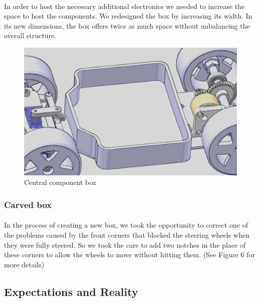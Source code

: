 \paragraph{}
In order to host the necessary additional electronics we needed to increase the
space to host the components. We redesigned the box by increasing its width.
In its new dimensions, the box offers twice as much space without unbalancing
the overall structure.

\begin{figure}[!ht]
    \begin{center}
        \includegraphics[scale=0.45]{Images/kart_central_box.png}
    \end{center}
    \caption{Central component box}
    \label{fig:raspi_config}
\end{figure}

\subsubsection{Carved box}
\paragraph{}

In the process of creating a new box, we took the opportunity to correct one
of the problems caused by the front corners that blocked the steering wheels
when they were fully steered. So we took the care to add two notches in
the place of these corners to allow the wheels to move without hitting them.
(See Figure 6 for more details)

\subsection{Expectations and Reality}
